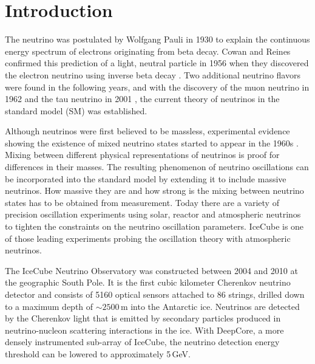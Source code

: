 \setchapterpreamble[u]{\margintoc}

\chapter{Introduction}


The neutrino was postulated by Wolfgang Pauli  in 1930 to explain the continuous energy spectrum of electrons originating from beta decay.
Cowan and Reines confirmed this prediction of a light, neutral particle in 1956 when they discovered the electron neutrino using inverse beta decay .
Two additional neutrino flavors were found in the following years, and with the discovery of the muon neutrino in 1962  and the tau neutrino in 2001 , the current theory of neutrinos in the standard model (SM) was established.

Although neutrinos were first believed to be massless, experimental evidence showing the existence of mixed neutrino states started to appear in the 1960s .
Mixing between different physical representations of neutrinos is proof for differences in their masses.
The resulting phenomenon of neutrino oscillations can be incorporated into the standard model by extending it to include massive neutrinos.
How massive they are and how strong is the mixing between neutrino states has to be obtained from measurement.
Today there are a variety of precision oscillation experiments using solar, reactor and atmospheric neutrinos to tighten the constraints on the neutrino oscillation parameters.
IceCube is one of those leading experiments probing the oscillation theory with atmospheric neutrinos.

The IceCube Neutrino Observatory  was constructed between 2004 and 2010 at the geographic South Pole.
It is the first cubic kilometer Cherenkov neutrino detector and consists of 5160 optical sensors attached to 86 strings, drilled down to a maximum depth of $\sim2500$\,m into the Antarctic ice.
Neutrinos are detected by the Cherenkov light that is emitted by secondary particles produced in neutrino-nucleon scattering interactions in the ice.
With DeepCore, a more densely instrumented sub-array of IceCube, the neutrino detection energy threshold can be lowered to approximately 5\,GeV.

